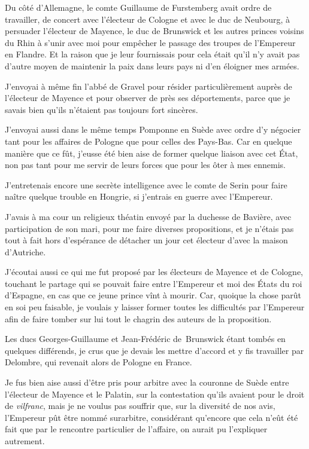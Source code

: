 \documentclass[french,twoside]{book} %
\begin{document}
Du côté d’Allemagne, le comte Guillaume de Furstemberg avait ordre de travailler, de concert avec l’électeur de Cologne et avec le duc de Neubourg, à persuader l’électeur de Mayence, le duc de Brunswick et les autres princes voisins du Rhin à s’unir avec moi pour empêcher le passage des troupes de l’Empereur en Flandre. Et la raison que je leur fournissais pour cela était qu’il n’y avait pas d’autre moyen de maintenir la paix dans leurs pays ni d’en éloigner mes armées.\par
J’envoyai à même fin l’abbé de Gravel pour résider particulièrement auprès de l’électeur de Mayence et pour observer de près ses déportements, parce que je savais bien qu’ils n’étaient pas toujours fort sincères.\par
J’envoyai aussi dans le même temps Pomponne en Suède avec ordre d’y négocier tant pour les affaires de Pologne que pour celles des Pays-Bas. Car en quelque manière que ce fût, j’eusse été bien aise de former quelque liaison avec cet État, non pas tant pour me servir de leurs forces que pour les ôter à mes ennemis.\par
J’entretenais encore une secrète intelligence avec le comte de Serin pour faire naître quelque trouble en Hongrie, si j’entrais en guerre avec l’Empereur.\par
J’avais à ma cour un religieux théatin envoyé par la duchesse de Bavière, avec participation de son mari, pour me faire diverses propositions, et je n’étais pas tout à fait hors d’espérance de détacher un jour cet électeur d’avec la maison d’Autriche.\par
J’écoutai aussi ce qui me fut proposé par les électeurs de Mayence et de Cologne, touchant le partage qui se pouvait faire entre l’Empereur et moi des États du roi d’Espagne, en cas que ce jeune prince vînt à mourir. Car, quoique la chose parût en soi peu faisable, je voulais y laisser former toutes les difficultés par l’Empereur afin de faire tomber sur lui tout le chagrin des auteurs de la proposition.\par
Les ducs Georges-Guillaume et Jean-Frédéric de Brunswick étant tombés en quelques différends, je crus que je devais les mettre d’accord et y fis travailler par Delombre, qui revenait alors de Pologne en France.\par
Je fus bien aise aussi d’être pris pour arbitre avec la couronne de Suède entre l’électeur de Mayence et le Palatin, sur la contestation qu’ils avaient pour le droit de {\itshape vilfranc}, mais je ne voulus pas souffrir que, sur la diversité de nos avis, l’Empereur pût être nommé surarbitre, considérant qu’encore que cela n’eût été fait que par le rencontre particulier de l’affaire, on aurait pu l’expliquer autrement.\par
\end{document}
